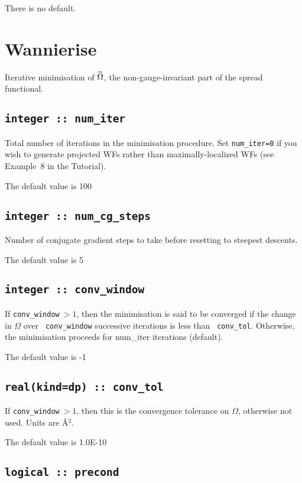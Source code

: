 There is no default.


\section{Wannierise}\label{sec:wann_params}
Iterative minimisation of $\widetilde{\Omega}$, the non-gauge-invariant part of the
spread functional.

\subsection[num\_iter]{\tt integer :: num\_iter}

Total number of iterations in the minimisation procedure.
Set {\tt num\_iter=0} if you wish to generate
  projected WFs rather than maximally-localized WFs (see Example~8 in
  the Tutorial).

The default value is 100

\subsection[num\_cg\_steps]{\tt integer :: num\_cg\_steps}

Number of conjugate gradient steps to take before resetting to steepest descents.

The default value is 5

\subsection[conv\_window]{\tt integer :: conv\_window}

If {\tt conv\_window}$\:>1$, then the minimisation is said to be
  converged if the change in $\Omega$ over {\tt
  conv\_window} successive iterations is less than {\tt
  conv\_tol}. Otherwise, the minimisation proceeds for
  {num\_iter} iterations (default).

The default value is -1

\subsection[conv\_tol]{\tt real(kind=dp) :: conv\_tol}

If {\tt conv\_window}$\:>1$, then this is the convergence tolerance on
$\Omega$, otherwise not used. Units are \AA$^2$.

The default value is 1.0E-10

\subsection[precond]{\tt logical :: precond}

